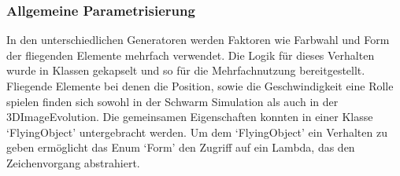 \documentclass[../mciAusarbeitung.tex]{subfiles}
\begin{document}
\subsubsection{Allgemeine Parametrisierung}\label{parametrisierung}
In den unterschiedlichen Generatoren werden Faktoren wie Farbwahl und Form der fliegenden Elemente mehrfach verwendet. Die Logik für dieses Verhalten wurde in Klassen gekapselt und so für die Mehrfachnutzung bereitgestellt.\\
Fliegende Elemente bei denen die Position, sowie die Geschwindigkeit eine Rolle spielen finden sich sowohl in der Schwarm Simulation als auch in der 3DImageEvolution. Die gemeinsamen Eigenschaften konnten in einer Klasse `FlyingObject' untergebracht werden. Um dem `FlyingObject' ein Verhalten zu geben ermöglicht das Enum `Form' den Zugriff auf ein Lambda, das den Zeichenvorgang abstrahiert.
\end{document}
